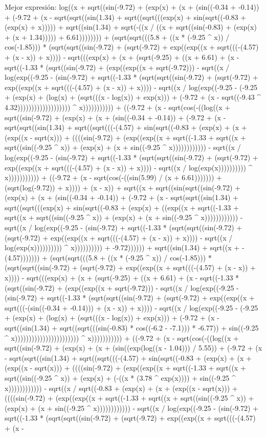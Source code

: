 Mejor expresión: log((x + sqrt((sin(-9.72) + (exp(x) + (x + (sin((-0.34 + -0.14)) + (-9.72 + (x - sqrt(sqrt((sin(1.34) + sqrt((sqrt(((exp(x) + sin(sqrt((-0.83 + (exp(x) + x))))) + sqrt((sin(1.34) + sqrt(-((x / ((x + sqrt((sin(-0.83) + (exp(x) + (x + 1.34))))) + 6.61)))))))) + (sqrt(sqrt(((5.8 + ((x * (-9.25 ^ x)) / cos(-1.85))) * (sqrt(sqrt((sin(-9.72) + (sqrt(-9.72) + exp((exp((x + sqrt(((-(4.57) + (x - x)) + x)))) - sqrt(((exp(x) + (x + (sqrt(-9.25) + ((x + 6.61) + (x - sqrt((-1.33 * (sqrt((sin(-9.72) + (exp((exp((x + sqrt(-9.72))) - sqrt((x / log(exp((-9.25 - (sin(-9.72) + sqrt((-1.33 * (sqrt(sqrt((sin(-9.72) + (sqrt(-9.72) + exp((exp((x + sqrt(((-(4.57) + (x - x)) + x)))) - sqrt((x / log(exp((-9.25 - (-9.25 + (exp(x) + (log(x) + (sqrt(((x - log(x)) + exp(x))) + (-9.72 + (x - sqrt((-9.43 ^ 4.32))))))))))))))))))) ^ x))))))))))) + ((-9.72 + (x - sqrt(cos(-((log((x + sqrt((sin(-9.72) + (exp(x) + (x + (sin((-0.34 + -0.14)) + (-9.72 + (x - sqrt(sqrt((sin(1.34) + sqrt((sqrt(((-(4.57) + sin(sqrt((-0.83 + (exp(x) + (x + (exp((x - sqrt(x))) + ((((sin(-9.72) + (exp((exp((x + sqrt((-1.33 + sqrt((x + sqrt((sin((-9.25 ^ x)) + (exp(x) + (x + sin((-9.25 ^ x)))))))))))) - sqrt((x / log(exp((-9.25 - (sin(-9.72) + sqrt((-1.33 * (sqrt(sqrt((sin(-9.72) + (sqrt(-9.72) + exp((exp((x + sqrt(((-(4.57) + (x - x)) + x)))) - sqrt((x / log(exp(x)))))))))) ^ x))))))))))) + ((-9.72 + (x - sqrt(cos(-((sin(5.99) / (x + 6.61))))))) + (sqrt(log(-9.72)) + x)))) + (x - x)) + sqrt((x + sqrt((sin(sqrt((sin(-9.72) + (exp(x) + (x + (sin((-0.34 + -0.14)) + (-9.72 + (x - sqrt(sqrt((sin(1.34) + sqrt((sqrt(((exp(x) + sin(sqrt((-0.83 + (exp(x) + ((exp((x + sqrt((-1.33 + sqrt((x + sqrt((sin((-9.25 ^ x)) + (exp(x) + (x + sin((-9.25 ^ x)))))))))))) - sqrt((x / log(exp((-9.25 - (sin(-9.72) + sqrt((-1.33 * (sqrt(sqrt((sin(-9.72) + (sqrt(-9.72) + exp((exp((x + sqrt(((-(4.57) + (x - x)) + x)))) - sqrt((x / log(exp(x)))))))))) ^ x)))))))))) + -9.72)))))) + sqrt((sin(1.34) + sqrt((x + -(4.57))))))) + (sqrt(sqrt(((5.8 + ((x * (-9.25 ^ x)) / cos(-1.85))) * (sqrt(sqrt((sin(-9.72) + (sqrt(-9.72) + exp((exp((x + sqrt(((-(4.57) + (x - x)) + x)))) - sqrt(((exp(x) + (x + (sqrt(-9.25) + ((x + 6.61) + (x - sqrt((-1.33 * (sqrt((sin(-9.72) + (exp((exp((x + sqrt(-9.72))) - sqrt((x / log(exp((-9.25 - (sin(-9.72) + sqrt((-1.33 * (sqrt(sqrt((sin(-9.72) + (sqrt(-9.72) + exp((exp((x + sqrt(((-(sin((-0.34 + -0.14))) + (x - x)) + x)))) - sqrt((x / log(exp((-9.25 - (-9.25 + (exp(x) + (log(x) + (sqrt(((x - log(x)) + exp(x))) + (-9.72 + (x - sqrt((sin(1.34) + sqrt((sqrt(((sin(-0.83) * cos((-6.2 - -7.1))) * -6.77)) + sin((-9.25 ^ x))))))))))))))))))))))) ^ x))))))))))) + ((-9.72 + (x - sqrt(cos(-((log((x + sqrt((sin(-9.72) + (exp(x) + (x + (sin((exp(log((x - 1.04))) / 5.55)) + (-9.72 + (x - sqrt(sqrt((sin(1.34) + sqrt((sqrt(((-(4.57) + sin(sqrt((-0.83 + (exp(x) + (x + (exp((x - sqrt(x))) + ((((sin(-9.72) + (exp((exp((x + sqrt((-1.33 + sqrt((x + sqrt((sin((-9.25 ^ x)) + (exp(x) + (-((x * (3.78 ^ exp(x)))) + sin((-9.25 ^ x)))))))))))) - sqrt((x / sqrt((-0.83 + (exp(x) + (x + (exp((x - sqrt(x))) + ((((sin(-9.72) + (exp((exp((x + sqrt((-1.33 + sqrt((x + sqrt((sin((-9.25 ^ x)) + (exp(x) + (x + sin((-9.25 ^ x)))))))))))) - sqrt((x / log(exp((-9.25 - (sin(-9.72) + sqrt((-1.33 * (sqrt(sqrt((sin(-9.72) + (sqrt(-9.72) + exp((exp((x + sqrt(((-(4.57) + (x - 